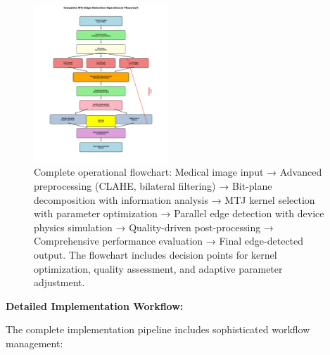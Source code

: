 \documentclass[conference]{IEEEtran}
\begin{document}
\begin{figure}[htbp]
\centerline{\includegraphics[width=0.45\textwidth]{operation_flowchart.png}}
\caption{Complete operational flowchart: Medical image input → Advanced preprocessing (CLAHE, bilateral filtering) → Bit-plane decomposition with information analysis → MTJ kernel selection with parameter optimization → Parallel edge detection with device physics simulation → Quality-driven post-processing → Comprehensive performance evaluation → Final edge-detected output. The flowchart includes decision points for kernel optimization, quality assessment, and adaptive parameter adjustment.}
\label{fig:flowchart}
\end{figure}

\textbf{Detailed Implementation Workflow:}

The complete implementation pipeline includes sophisticated workflow management:
\end{document}
